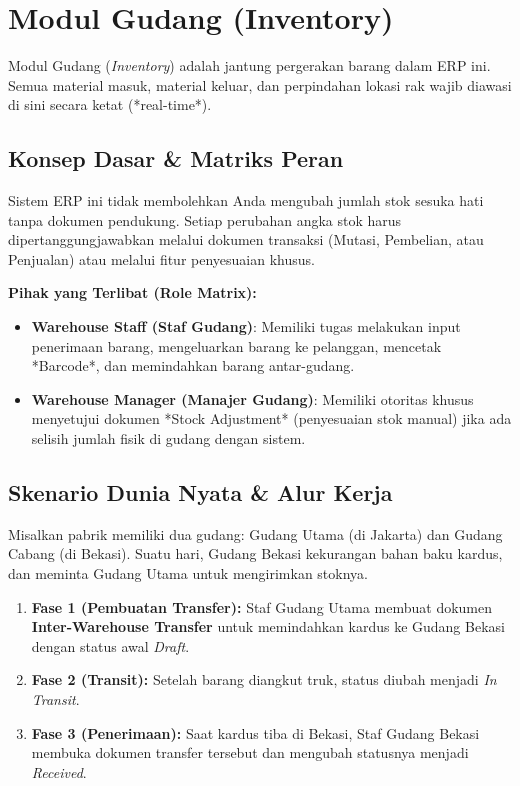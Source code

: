 \chapter{Modul Gudang (Inventory)}

Modul Gudang (\textit{Inventory}) adalah jantung pergerakan barang dalam ERP ini. Semua material masuk, material keluar, dan perpindahan lokasi rak wajib diawasi di sini secara ketat (*real-time*).

\section{Konsep Dasar \& Matriks Peran}
Sistem ERP ini tidak membolehkan Anda mengubah jumlah stok sesuka hati tanpa dokumen pendukung. Setiap perubahan angka stok harus dipertanggungjawabkan melalui dokumen transaksi (Mutasi, Pembelian, atau Penjualan) atau melalui fitur penyesuaian khusus.

\textbf{Pihak yang Terlibat (Role Matrix):}
\begin{itemize}
    \item \textbf{Warehouse Staff (Staf Gudang)}: Memiliki tugas melakukan input penerimaan barang, mengeluarkan barang ke pelanggan, mencetak *Barcode*, dan memindahkan barang antar-gudang.
    \item \textbf{Warehouse Manager (Manajer Gudang)}: Memiliki otoritas khusus menyetujui dokumen *Stock Adjustment* (penyesuaian stok manual) jika ada selisih jumlah fisik di gudang dengan sistem.
\end{itemize}

\section{Skenario Dunia Nyata \& Alur Kerja}
Misalkan pabrik memiliki dua gudang: Gudang Utama (di Jakarta) dan Gudang Cabang (di Bekasi). Suatu hari, Gudang Bekasi kekurangan bahan baku kardus, dan meminta Gudang Utama untuk mengirimkan stoknya.
\begin{enumerate}
    \item \textbf{Fase 1 (Pembuatan Transfer):} Staf Gudang Utama membuat dokumen \textbf{Inter-Warehouse Transfer} untuk memindahkan kardus ke Gudang Bekasi dengan status awal \textit{Draft}.
    \item \textbf{Fase 2 (Transit):} Setelah barang diangkut truk, status diubah menjadi \textit{In Transit}.
    \item \textbf{Fase 3 (Penerimaan):} Saat kardus tiba di Bekasi, Staf Gudang Bekasi membuka dokumen transfer tersebut dan mengubah statusnya menjadi \textit{Received}.
\end{enumerate}

